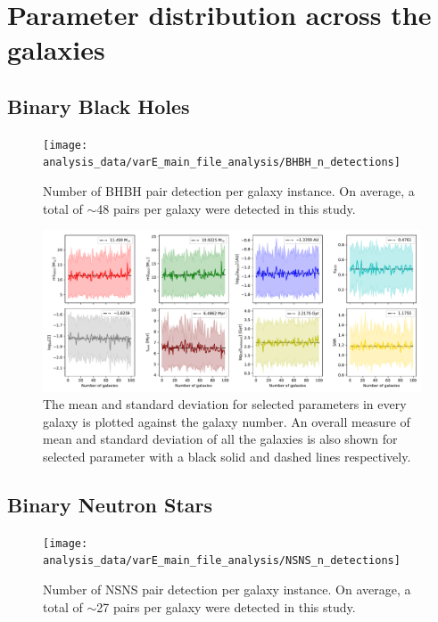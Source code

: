\section{Parameter distribution across the galaxies}
\label{sec:paramter-distribution-across-the-galaxies}
\subsection{Binary Black Holes}
\begin{figure}[!h]
    \centering
    \texttt{[image: analysis\_data/varE\_main\_file\_analysis/BHBH\_n\_detections]}
    \caption{Number of BHBH pair detection per galaxy instance. On average, a total of $\sim$48 pairs per galaxy were detected in this study.}
    \label{fig:bhbhndetections}
\end{figure}

\begin{figure}[!h]
    \centering
    \includegraphics[width=\columnwidth]{analysis_data/varE_main_file_analysis/BHBH_n_galaxy_mean_plot}
    \caption{The mean and standard deviation for selected parameters in every galaxy is plotted against the galaxy number. An overall measure of mean and standard deviation of all the galaxies is also shown for selected parameter with a black solid and dashed lines respectively.}
    \label{fig:bhbh_n_galaxy_mean_plot}
\end{figure}

\subsection{Binary Neutron Stars}
\begin{figure}[!h]
	\centering
	\texttt{[image: analysis\_data/varE\_main\_file\_analysis/NSNS\_n\_detections]}
	\caption{Number of NSNS pair detection per galaxy instance. On average, a total of $\sim$27 pairs per galaxy were detected in this study.}
	\label{fig:nsnsndetections}
\end{figure}

